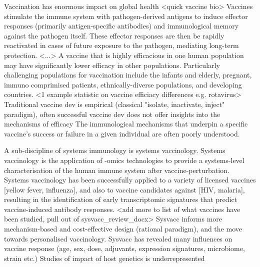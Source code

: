 \begin{outline}
\1 Vaccination has enormous impact on global health \autocite{greenwood2014ContributionVaccinationGlobal}
    \2 <quick vaccine bio>
        \3 Vaccines stimulate the immune system with pathogen-derived antigens to induce effector responses (primarily antigen-specific antibodies) and immunological memory against the pathogen itself.
        \3 These effector responses are then be rapidly reactivated in cases of future exposure to the pathogen, mediating long-term protection.
        \3 <...>
    \2 A vaccine that is highly efficacious in one human population may have significantly lower efficacy in other populations.
    Particularly challenging populations for vaccination include the infants and elderly, pregnant, immuno comprimised patients, ethnically-diverse populations, and developing countries.
        \3 <1 example statistic on vaccine efficiacy differences e.g. rotavirus>
    \2 Traditional vaccine dev is empirical (classical "isolate, inactivate, inject" paradigm), often successful vaccine dev does not offer insights into the mechanisms of efficacy 
    \2 The immunological mechanisms that underpin a specific vaccine's success or failure in a given individual are often poorly understood.

\1 A sub-discipline of systems immunology is systems vaccinology.
    \2 Systems vaccinology is the application of -omics technologies to provide a systems-level characterisation of the human immune system after vaccine-perturbation.
    \2 Systems vaccinology has been successfully applied to a variety of licensed vaccines [yellow fever, influenza], and also to vaccine candidates against [HIV, malaria], resulting in the identification of early transcriptomic signatures that predict vaccine-induced antibody responses.
        \3 <add more to list of what vaccines have been studied, pull out of sysvacc\_review\_docx>
    \2 Sysvacc informs more mechanism-based and cost-effective design (rational paradigm), and the move towards personalised vaccinology.
    \2 Sysvacc has revealed many influences on vaccine response (age, sex, dose, adjuvants, expression signatures, microbiome, strain etc.)
    \2 Studies of impact of host genetics is underrepresented \autocite{linnik2016ImpactHostGenetic}


\end{outline}
